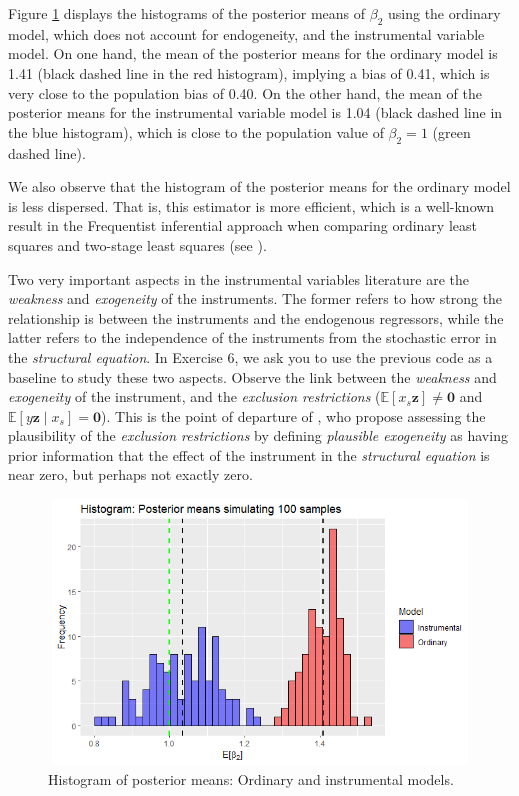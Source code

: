 Figure \ref{fig71} displays the histograms of the posterior means of \( \beta_2 \) using the ordinary model, which does not account for endogeneity, and the instrumental variable model. On one hand, the mean of the posterior means for the ordinary model is 1.41 (black dashed line in the red histogram), implying a bias of 0.41, which is very close to the population bias of 0.40. On the other hand, the mean of the posterior means for the instrumental variable model is 1.04 (black dashed line in the blue histogram), which is close to the population value of \( \beta_2 = 1 \) (green dashed line).

We also observe that the histogram of the posterior means for the ordinary model is less dispersed. That is, this estimator is more efficient, which is a well-known result in the Frequentist inferential approach when comparing ordinary least squares and two-stage least squares (see \cite[Chap. ~5]{wooldridge2010econometric}).

Two very important aspects in the instrumental variables literature are the \textit{weakness} and \textit{exogeneity} of the instruments. The former refers to how strong the relationship is between the instruments and the endogenous regressors, while the latter refers to the independence of the instruments from the stochastic error in the \textit{structural equation}. In Exercise 6, we ask you to use the previous code as a baseline to study these two aspects. Observe the link between the \textit{weakness} and \textit{exogeneity} of the instrument, and the \textit{exclusion restrictions} (\( \mathbb{E}[x_s \bm{z}] \neq \bm{0} \) and \( \mathbb{E}[y \bm{z} \mid x_s] = \bm{0} \)). This is the point of departure of \cite{Conley2012}, who propose assessing the plausibility of the \textit{exclusion restrictions} by defining \textit{plausible exogeneity} as having prior information that the effect of the instrument in the \textit{structural equation} is near zero, but perhaps not exactly zero.
 
\begin{figure}
	\includegraphics[width=340pt, height=200pt]{Chapters/chapter7/figures/Fig71.png}
	\caption[List of figure caption goes here]{Histogram of posterior means: Ordinary and instrumental models.}\label{fig71}
\end{figure}

